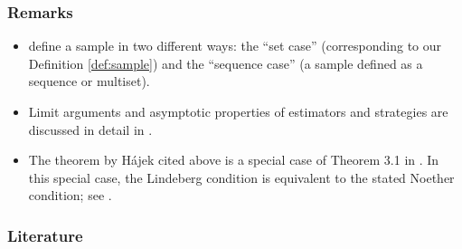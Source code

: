 \documentclass{my_eth_beamer}
\numberwithin{equation}{section}
\begin{document}
\begin{frame}
    \frametitle{Remarks}
    {\footnotesize
    \begin{itemize}
        \item \citet[][Chapters 1.2 and 1.3]{cassel_sarndal_etal_1977}
            define a sample in two different ways: the ``set case''
            (corresponding to our Definition \ref{def:sample}) and the
            ``sequence case'' (a sample defined as a sequence or multiset).
        \item Limit arguments and asymptotic properties of estimators and
            strategies are discussed in detail in
            \citet[][Chapter 1.3]{fuller_2009}.
        \item The theorem by H{\'a}jek cited above is a special case of
            Theorem 3.1 in \citet{hajek_1960}. In this special case, the
            Lindeberg condition is equivalent to the stated Noether
            condition; see \citet[][Remark 3.3]{hajek_1960}.
    \end{itemize}
    }
\end{frame}

\setcounter{section}{\the\numexpr\value{section}-1\relax}
\begin{frame}
    \frametitle{Literature}
    {\footnotesize
        
        
    }
\end{frame}

\lastpage
\end{document}
